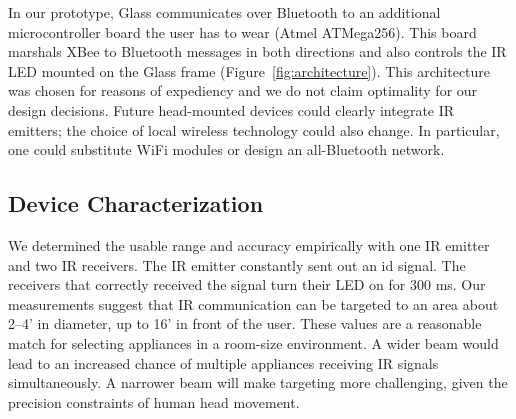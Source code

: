 In our prototype, Glass communicates over Bluetooth to an additional microcontroller board the user has to wear (Atmel ATMega256). This board marshals XBee to Bluetooth messages in both directions and also controls the IR LED mounted on the Glass frame (Figure~\ref{fig:architecture}). This architecture was chosen for reasons of expediency and we do not claim optimality for our design decisions. Future head-mounted devices could clearly integrate IR emitters; the choice of local wireless technology could also change. In particular, one could substitute WiFi modules or design an all-Bluetooth network.


\subsection{Device Characterization}
We determined the usable range and accuracy empirically with one IR emitter and two IR receivers. The IR emitter constantly sent out an id signal. The receivers that correctly received the signal turn their LED on for 300 ms. Our measurements suggest that IR communication can be targeted to an area about 2--4' in diameter, up to 16' in front of the user. These values are a reasonable match for selecting appliances in a room-size environment. A wider beam would lead to an increased chance of multiple appliances receiving IR signals simultaneously. A narrower beam will make targeting more challenging, given the precision constraints of human head movement.
